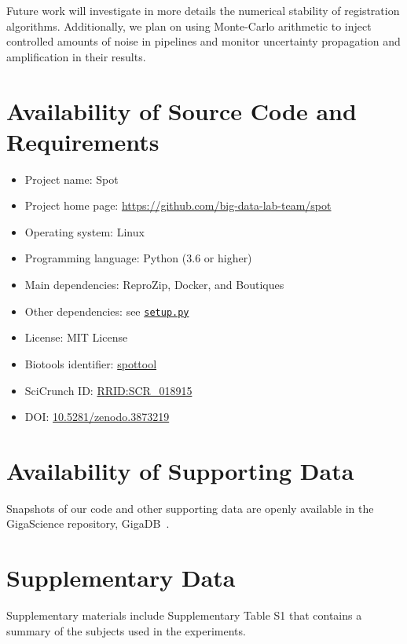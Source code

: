 \documentclass[a4paper,num-refs]{oup-contemporary}
\newcommand{\revised}[1]{\color{blue}#1\color{black}\xspace}
\newcommand{\reprozip}[0]{ReproZip\xspace}
\newcommand{\toolname}[0]{Spot\xspace}
\begin{document}
Future work will investigate in more details the numerical stability of
registration algorithms. Additionally, we plan on using Monte-Carlo arithmetic
to inject controlled amounts of noise in pipelines and monitor
uncertainty propagation and amplification in their results.

\revised{
\section{Availability of Source Code and Requirements}
\begin{itemize}
  \item Project name: \toolname
  \item Project home page: \url{https://github.com/big-data-lab-team/spot}
  \item Operating system: Linux
  \item Programming language: Python (3.6 or higher)
  \item Main dependencies: \reprozip, Docker, and Boutiques
  \item Other dependencies: see \href{https://github.com/big-data-lab-team/spot}{\texttt{setup.py}}
  \item License: MIT License
  \item Biotools identifier: \href{https://bio.tools/spottool}{spottool}
  \item SciCrunch ID: \href{https://scicrunch.org/scicrunch/Resources/record/nlx_144509-1/SCR_018915/resolver}{RRID:SCR\_018915}
  \item DOI: \href{https://doi.org/10.5281/zenodo.3873219}{10.5281/zenodo.3873219}


\end{itemize}

\section{Availability of Supporting Data}
Snapshots of our code and other supporting data are openly available in the GigaScience repository, GigaDB~\cite{salari2020global}.

\section{Supplementary Data}
Supplementary materials include Supplementary Table S1 that contains a summary of the subjects used in the experiments.
}
\end{document}
